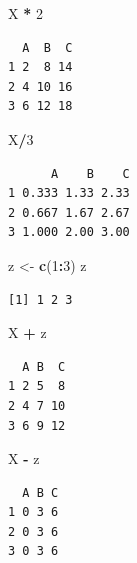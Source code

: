 \documentclass[11pt,a4paper]{book}
\newenvironment{Shaded}{\begin{snugshade}}{\end{snugshade}}
\newcommand{\KeywordTok}[1]{\textcolor[rgb]{0.13,0.29,0.53}{\textbf{#1}}}
\newcommand{\DecValTok}[1]{\textcolor[rgb]{0.00,0.00,0.81}{#1}}
\newcommand{\StringTok}[1]{\textcolor[rgb]{0.31,0.60,0.02}{#1}}
\newcommand{\OperatorTok}[1]{\textcolor[rgb]{0.81,0.36,0.00}{\textbf{#1}}}
\newcommand{\NormalTok}[1]{#1}
\theoremstyle{definition}
\theoremstyle{definition}
\theoremstyle{definition}
\theoremstyle{remark}
\begin{document}
\begin{Shaded}
\begin{Highlighting}[]
\NormalTok{X }\OperatorTok{*}\StringTok{ }\DecValTok{2}
\end{Highlighting}
\end{Shaded}

\begin{verbatim}
  A  B  C
1 2  8 14
2 4 10 16
3 6 12 18
\end{verbatim}

\begin{Shaded}
\begin{Highlighting}[]
\NormalTok{X}\OperatorTok{/}\DecValTok{3}
\end{Highlighting}
\end{Shaded}

\begin{verbatim}
      A    B    C
1 0.333 1.33 2.33
2 0.667 1.67 2.67
3 1.000 2.00 3.00
\end{verbatim}

\begin{Shaded}
\begin{Highlighting}[]
\NormalTok{z <-}\StringTok{ }\KeywordTok{c}\NormalTok{(}\DecValTok{1}\OperatorTok{:}\DecValTok{3}\NormalTok{)}
\NormalTok{z}
\end{Highlighting}
\end{Shaded}

\begin{verbatim}
[1] 1 2 3
\end{verbatim}

\begin{Shaded}
\begin{Highlighting}[]
\NormalTok{X }\OperatorTok{+}\StringTok{ }\NormalTok{z}
\end{Highlighting}
\end{Shaded}

\begin{verbatim}
  A B  C
1 2 5  8
2 4 7 10
3 6 9 12
\end{verbatim}

\begin{Shaded}
\begin{Highlighting}[]
\NormalTok{X }\OperatorTok{-}\StringTok{ }\NormalTok{z}
\end{Highlighting}
\end{Shaded}

\begin{verbatim}
  A B C
1 0 3 6
2 0 3 6
3 0 3 6
\end{verbatim}
\end{document}
